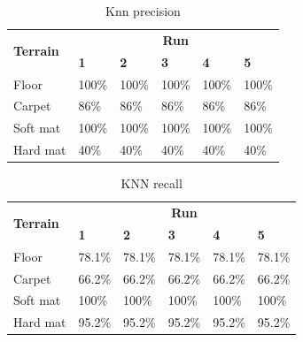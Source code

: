 \documentclass[USenglish]{ifimaster}  %
\begin{document}
\begin{table}[h]
	\centering
	\begin{tabular}{@{}llllll@{}}
		\toprule
		\multirow{2}{*}{\textbf{Terrain}} & \multicolumn{5}{c}{\textbf{Run}} \\ \cmidrule(l){2-6} 
		& \multicolumn{1}{l|}{\textbf{1}} & \multicolumn{1}{l|}{\textbf{2}} & \multicolumn{1}{l|}{\textbf{3}} & \multicolumn{1}{l|}{\textbf{4}} & \textbf{5} \\ \midrule
		\multicolumn{1}{l|}{Floor} & \multicolumn{1}{l|}{100\%} & \multicolumn{1}{l|}{100\%} & \multicolumn{1}{l|}{100\%} & \multicolumn{1}{l|}{100\%} & 100\% \\ \midrule
		\multicolumn{1}{l|}{Carpet} & \multicolumn{1}{l|}{86\%} & \multicolumn{1}{l|}{86\%} & \multicolumn{1}{l|}{86\%} & \multicolumn{1}{l|}{86\%} & 86\% \\ \midrule
		\multicolumn{1}{l|}{Soft mat} & \multicolumn{1}{l|}{100\%} & \multicolumn{1}{l|}{100\%} & \multicolumn{1}{l|}{100\%} & \multicolumn{1}{l|}{100\%} & 100\% \\ \midrule
		\multicolumn{1}{l|}{Hard mat} & \multicolumn{1}{l|}{40\%} & \multicolumn{1}{l|}{40\%} & \multicolumn{1}{l|}{40\%} & \multicolumn{1}{l|}{40\%} & 40\% \\ \bottomrule
	\end{tabular}
	\caption{Knn precision}
	\label{precisionKNN}
\end{table}
\FloatBarrier

\begin{table}[h]
	\centering
	\begin{tabular}{@{}llllll@{}}
		\toprule
		\multirow{2}{*}{\textbf{Terrain}} & \multicolumn{5}{c}{\textbf{Run}} \\ \cmidrule(l){2-6} 
		& \multicolumn{1}{l|}{\textbf{1}} & \multicolumn{1}{l|}{\textbf{2}} & \multicolumn{1}{l|}{\textbf{3}} & \multicolumn{1}{l|}{\textbf{4}} & \textbf{5} \\ \midrule
		\multicolumn{1}{l|}{Floor} & \multicolumn{1}{l|}{78.1\%} & \multicolumn{1}{l|}{78.1\%} & \multicolumn{1}{l|}{78.1\%} & \multicolumn{1}{l|}{78.1\%} & 78.1\% \\ \midrule
		\multicolumn{1}{l|}{Carpet} & \multicolumn{1}{l|}{66.2\%} & \multicolumn{1}{l|}{66.2\%} & \multicolumn{1}{l|}{66.2\%} & \multicolumn{1}{l|}{66.2\%} & 66.2\% \\ \midrule
		\multicolumn{1}{l|}{Soft mat} & \multicolumn{1}{l|}{100\%} & \multicolumn{1}{l|}{100\%} & \multicolumn{1}{l|}{100\%} & \multicolumn{1}{l|}{100\%} & 100\% \\ \midrule
		\multicolumn{1}{l|}{Hard mat} & \multicolumn{1}{l|}{95.2\%} & \multicolumn{1}{l|}{95.2\%} & \multicolumn{1}{l|}{95.2\%} & \multicolumn{1}{l|}{95.2\%} & 95.2\% \\ \bottomrule
	\end{tabular}
	\caption{KNN recall}
	\label{knnrecall}
\end{table}
\FloatBarrier
\end{document}
